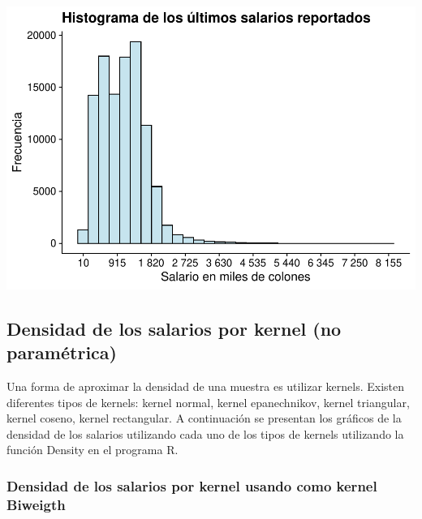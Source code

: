 \documentclass[
]{article}
\begin{document}
\includegraphics{mientras_files/figure-latex/unnamed-chunk-12-1.pdf}

\hypertarget{densidad-de-los-salarios-por-kernel-no-paramuxe9trica}{%
\subsection{Densidad de los salarios por kernel (no
paramétrica)}\label{densidad-de-los-salarios-por-kernel-no-paramuxe9trica}}

Una forma de aproximar la densidad de una muestra es utilizar kernels.
Existen diferentes tipos de kernels: kernel normal, kernel epanechnikov,
kernel triangular, kernel coseno, kernel rectangular. A continuación se
presentan los gráficos de la densidad de los salarios utilizando cada
uno de los tipos de kernels utilizando la función Density en el programa
R.

\hypertarget{densidad-de-los-salarios-por-kernel-usando-como-kernel-biweigth}{%
\subsubsection{Densidad de los salarios por kernel usando como kernel
Biweigth}\label{densidad-de-los-salarios-por-kernel-usando-como-kernel-biweigth}}
\end{document}

